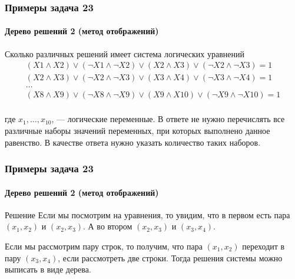 \begin{frame}[t]
\frametitle{Примеры задача 23}
\framesubtitle{Дерево решений 2 (метод отображений)}
Сколько различных решений имеет система логических уравнений 
\begin{align*}
(X1 \wedge X2) \vee (\neg X1 \wedge \neg X2) \vee (X2 \wedge X3) \vee (\neg X2 \wedge \neg X3) = 1\\
(X2 \wedge X3) \vee (\neg X2 \wedge \neg X3) \vee (X3 \wedge X4) \vee (\neg X3 \wedge \neg X4) = 1\\
\ldots\\
(X8 \wedge X9) \vee (\neg X8 \wedge \neg X9) \vee (X9 \wedge X10) \vee (\neg X9 \wedge \neg X10) = 1\\
\end{align*}


где $x_1, \ldots, x_{10}$, --- логические переменные. В ответе не нужно перечислять все различные наборы значений переменных, при которых выполнено данное равенство. В качестве ответа нужно указать количество таких наборов.

	
\end{frame}

\begin{frame}[t]
\frametitle{Примеры задача 23}
\framesubtitle{Дерево решений 2 (метод отображений)}

\begin{block}{Решение}
Если мы посмотрим на уравнения, то увидим, что в первом есть пара $(x_1,x_2)$ и $(x_2,x_3)$. А во втором
$(x_2,x_3)$ и $(x_3,x_4)$. 
	\pause 

Если мы рассмотрим пару строк, то получим, что пара $(x_1,x_2)$ переходит в пару $(x_3,x_4)$, если рассмотреть две строки. Тогда решения системы можно выписать в виде дерева.

\end{block}
	
\end{frame}

